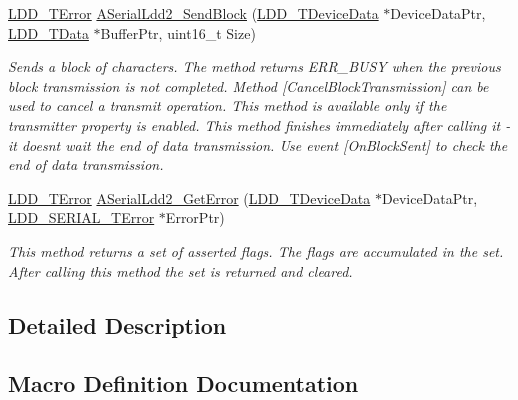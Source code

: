 \begin{DoxyCompactItemize}
\hyperlink{group___p_e___types__module_ga24c2b045fd04e79e85f261ce4df35588}{L\+D\+D\+\_\+\+T\+Error} \hyperlink{group___a_serial_ldd2__module_gabd167598efd957d04eb9bdd2e51ae673}{A\+Serial\+Ldd2\+\_\+\+Send\+Block} (\hyperlink{group___p_e___types__module_gac5cf1362f1f0e3a2ce71b1bf2276d091}{L\+D\+D\+\_\+\+T\+Device\+Data} $\ast$Device\+Data\+Ptr, \hyperlink{group___p_e___types__module_gade8ef9401405bd941b6da738b807f980}{L\+D\+D\+\_\+\+T\+Data} $\ast$Buffer\+Ptr, uint16\+\_\+t Size)
\begin{DoxyCompactList}\small\item\em Sends a block of characters. The method returns E\+R\+R\+\_\+\+B\+U\+SY when the previous block transmission is not completed. Method \mbox{[}Cancel\+Block\+Transmission\mbox{]} can be used to cancel a transmit operation. This method is available only if the transmitter property is enabled. This method finishes immediately after calling it -\/ it doesn\textquotesingle{}t wait the end of data transmission. Use event \mbox{[}On\+Block\+Sent\mbox{]} to check the end of data transmission. \end{DoxyCompactList}\item 
\hyperlink{group___p_e___types__module_ga24c2b045fd04e79e85f261ce4df35588}{L\+D\+D\+\_\+\+T\+Error} \hyperlink{group___a_serial_ldd2__module_gafab1fb38c1ca4d64933a973a271ad7b0}{A\+Serial\+Ldd2\+\_\+\+Get\+Error} (\hyperlink{group___p_e___types__module_gac5cf1362f1f0e3a2ce71b1bf2276d091}{L\+D\+D\+\_\+\+T\+Device\+Data} $\ast$Device\+Data\+Ptr, \hyperlink{group___p_e___types__module_ga3bd5d57e02458ce220540d0ad0462e06}{L\+D\+D\+\_\+\+S\+E\+R\+I\+A\+L\+\_\+\+T\+Error} $\ast$Error\+Ptr)
\begin{DoxyCompactList}\small\item\em This method returns a set of asserted flags. The flags are accumulated in the set. After calling this method the set is returned and cleared. \end{DoxyCompactList}\end{DoxyCompactItemize}


\subsection{Detailed Description}


\subsection{Macro Definition Documentation}
